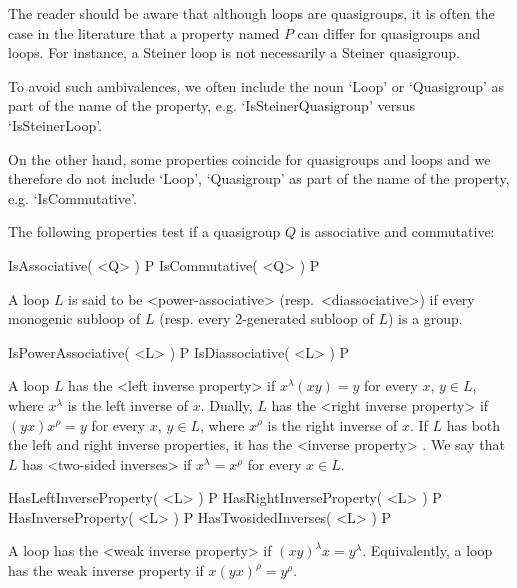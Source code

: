 
The reader should be aware that although loops are quasigroups, it is often the
case in the literature that a property named $P$ can differ for quasigroups and
loops. For instance, a Steiner loop is not necessarily a Steiner quasigroup.

To avoid such ambivalences, we often include the noun `Loop' or `Quasigroup' as
part of the name of the property, e.g. `IsSteinerQuasigroup' versus
`IsSteinerLoop'.

On the other hand, some properties coincide for quasigroups and loops and we
therefore do not include `Loop', `Quasigroup' as part of the name of the
property, e.g. `IsCommutative'.


The following properties test if a quasigroup $Q$ is associative and
commutative:

\>IsAssociative( <Q> ) P
\>IsCommutative( <Q> ) P

A loop $L$ is said to be <power-associative>
(resp.\ <diassociative>) if every monogenic subloop
of $L$ (resp. every $2$-generated subloop of $L$) is a group.

\>IsPowerAssociative( <L> ) P
\>IsDiassociative( <L> ) P


A loop $L$ has the <left inverse property>
%
%
 if $x^\lambda(xy)=y$
for every $x$, $y\in L$, where $x^\lambda$ is the left inverse of $x$. Dually,
$L$ has the <right inverse property>
%
%
 if $(yx)x^\rho=y$ for every $x$,
$y\in L$, where $x^\rho$ is the right inverse of $x$. If $L$ has both the left
and right inverse properties, it has the <inverse property>
%
%
. We say that $L$
has <two-sided inverses>
%
%
 if $x^\lambda=x^\rho$ for every $x\in L$.

\>HasLeftInverseProperty( <L> ) P
\>HasRightInverseProperty( <L> ) P
\>HasInverseProperty( <L> ) P
\>HasTwosidedInverses( <L> ) P

A loop has the <weak inverse property>
%
%
 if $(xy)^\lambda x = y^\lambda$.
Equivalently, a loop has the weak inverse property if $x(yx)^\rho = y^\rho$.

